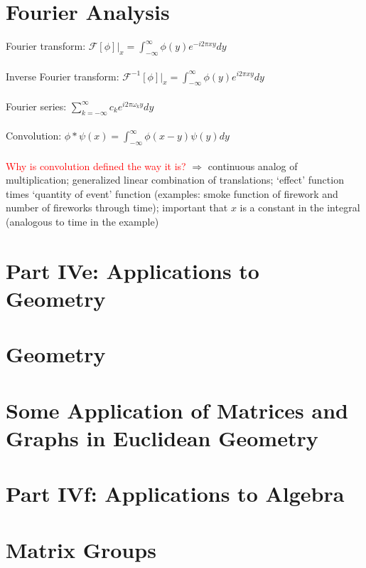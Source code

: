 \documentclass[a4paper]{article}
\newcommand{\followup}[1]{\textcolor{red}{ #1 }}
\begin{document}
\section{Fourier Analysis}
Fourier transform: 
$\mathcal{F} [\phi]|_x = \int_{-\infty}^{\infty} \phi (y) e^{-i2\pi xy}dy$
\\~\\
Inverse Fourier transform: 
$\mathcal{F}^{-1} [\phi]|_x = \int_{-\infty}^{\infty} \phi(y) e^{i2\pi xy}dy$
\\~\\
Fourier series:
$\sum\limits_{k=-\infty}^{\infty} c_k e^{i2\pi \omega_k y}dy$
\\~\\
Convolution: 
$\phi * \psi (x) = \int_{-\infty}^{\infty} \phi (x-y) \psi (y) dy$
\\~\\
\followup{Why is convolution defined the way it is?} $\Rightarrow$ continuous analog of multiplication; generalized linear combination of translations; 
`effect' function times `quantity of event' function (examples: smoke function of firework and number of fireworks through time); important that $x$ is a constant in the integral (analogous to time in the example)
\newpage
\section*{Part IVe: Applications to Geometry}

\section{Geometry}

\section{Some Application of Matrices and Graphs in Euclidean Geometry}

\section*{Part IVf: Applications to Algebra}

\section{Matrix Groups}
\end{document}
